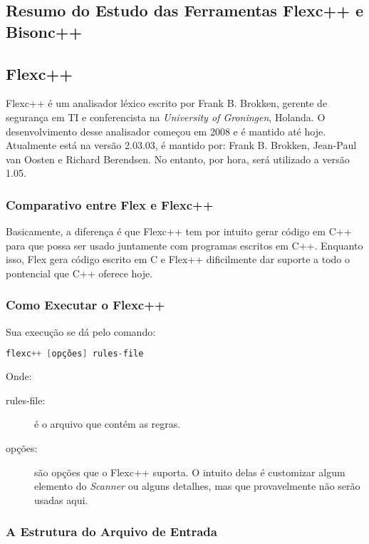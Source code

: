 \begin{apendicesenv}

\chapter{Resumo do Estudo das Ferramentas Flexc++ e Bisonc++}

\section{Flexc++}
Flexc++ é um analisador léxico escrito por Frank B. Brokken, gerente de segurança em TI e conferencista na \textit{University of Groningen}, Holanda. O desenvolvimento desse analisador começou em 2008 e é mantido até hoje. Atualmente está na versão 2.03.03, é mantido por: Frank B. Brokken, Jean-Paul van Oosten e Richard Berendsen. No entanto, por hora, será utilizado a versão 1.05.

\subsection{Comparativo entre Flex e Flexc++}
\par
\indent Basicamente, a diferença é que Flexc++ tem por intuito gerar código em C++ para que possa ser usado juntamente com programas escritos em C++. Enquanto isso, Flex gera código escrito em C e Flex++ dificilmente dar suporte a todo o pontencial que C++ oferece hoje.

\subsection{Como Executar o Flexc++}

Sua execução se dá pelo comando:
\begin{lstlisting}[language=c, label=apendiceCodigoFlex1, caption=Comando para Execução do Flexc++]
 flexc++ [opções] rules-file
\end{lstlisting}

Onde:
\begin{description}
\item[rules-file:] é o arquivo que contém as regras.
\item[opções:] são opções que o Flexc++ suporta. O intuito delas é customizar algum elemento do \textit{Scanner} ou alguns detalhes, mas que provavelmente não serão usadas aqui. 
\end{description}

\subsection{A Estrutura do Arquivo de Entrada}


\end{apendicesenv}
